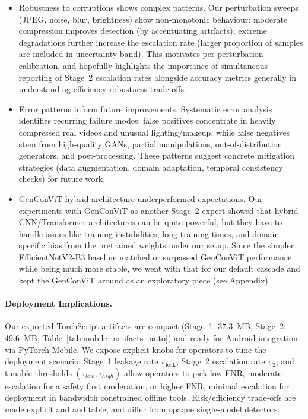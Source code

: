 \begin{itemize}[leftmargin=*,itemsep=2pt,parsep=0pt]
  \item Robustness to corruptions shows complex patterns. Our perturbation sweeps (JPEG, noise, blur, brightness) show non\hyp monotonic behaviour: moderate compression improves detection (by accentuating artifacts); extreme degradations further increase the escalation rate (larger proportion of samples are included in uncertainty band). This motivates per\hyp perturbation calibration, and hopefully highlights the importance of simultaneous reporting of Stage~2 escalation rates alongside accuracy metrics generally in understanding efficiency\hyp robustness trade\hyp offs.

  \item Error patterns inform future improvements. Systematic error analysis identifies recurring failure modes: false positives concentrate in heavily compressed real videos and unusual lighting/makeup, while false negatives stem from high\hyp quality GANs, partial manipulations, out\hyp of\hyp distribution generators, and post\hyp processing. These patterns suggest concrete mitigation strategies (data augmentation, domain adaptation, temporal consistency checks) for future work.

  \item GenConViT hybrid architecture underperformed expectations. Our experiments with GenConViT as another Stage~2 expert showed that hybrid CNN/Transformer architectures can be quite powerful, but they have to handle issues like training instabilities, long training times, and domain\hyp specific bias from the pretrained weights under our setup. Since the simpler EfficientNetV2\hyp B3 baseline matched or surpassed GenConViT performance while being much more stable, we went with that for our default cascade and kept the GenConViT around as an exploratory piece (see Appendix).
\end{itemize}

\paragraph{Deployment Implications.}
Our exported TorchScript artifacts are compact (Stage~1: \SI{37.3}{MB}, Stage~2: \SI{49.6}{MB}; Table~\ref{tab:mobile_artifacts_auto}) and ready for Android integration via PyTorch Mobile. We expose explicit knobs for operators to tune the deployment scenario: Stage~1 leakage rate $\pi_{\mathrm{leak}}$, Stage~2 escalation rate $\pi_2$, and tunable thresholds $(\tau_{low}, \tau_{high})$ allow operators to pick low FNR, moderate escalation for a safety first moderation, or higher FNR, minimal escalation for deployment in bandwidth constrained offline tools. Risk/efficiency trade\hyp offs are made explicit and auditable, and differ from opaque single\hyp model detectors.

